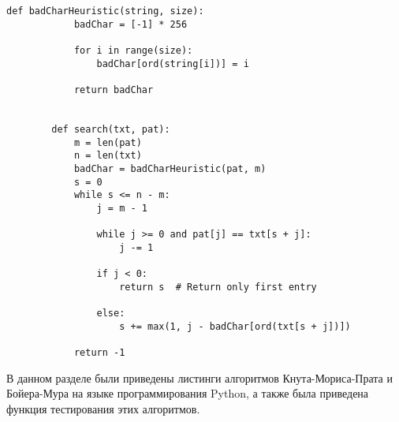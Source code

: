 \documentclass[../main.tex]{subfiles}
\begin{document}
	\begin{lstlisting}[label=list:2, caption=Алгоритма Бойера-Мура]
		def badCharHeuristic(string, size):
    		badChar = [-1] * 256
	    	
	    	for i in range(size):
	        	badChar[ord(string[i])] = i

    		return badChar


		def search(txt, pat):
		    m = len(pat)
		    n = len(txt)
		    badChar = badCharHeuristic(pat, m)
		    s = 0
		    while s <= n - m:
		        j = m - 1

		        while j >= 0 and pat[j] == txt[s + j]:
		            j -= 1

		        if j < 0:
		            return s  # Return only first entry

		        else:
		            s += max(1, j - badChar[ord(txt[s + j])])

		    return -1
	\end{lstlisting}
	
	В данном разделе были приведены листинги алгоритмов Кнута-Мориса-Прата и Бойера-Мура на языке программирования Python, а также была приведена функция тестирования этих алгоритмов.

	
\end{document}
